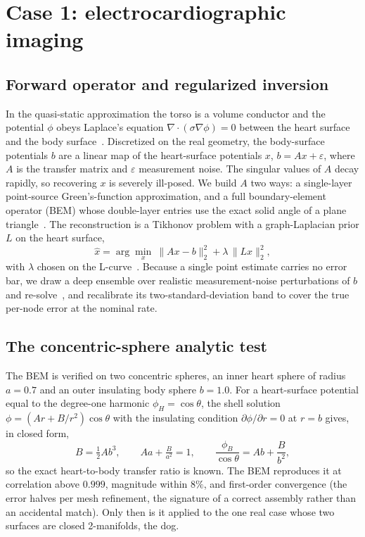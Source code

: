 \documentclass[journal]{IEEEtran}
\begin{document}
\section{Case 1: electrocardiographic imaging}
\label{sec:ecgi}

\subsection{Forward operator and regularized inversion}

In the quasi-static approximation the torso is a volume conductor and the potential $\phi$
obeys Laplace's equation $\nabla\!\cdot(\sigma\nabla\phi)=0$ between the heart surface and the
body surface~\cite{bear2015}. Discretized on the real geometry, the body-surface potentials
$b$ are a linear map of the heart-surface potentials $x$, $b=Ax+\varepsilon$, where $A$ is the
transfer matrix and $\varepsilon$ measurement noise. The singular values of $A$ decay rapidly,
so recovering $x$ is severely ill-posed. We build $A$ two ways: a single-layer point-source
Green's-function approximation, and a full boundary-element operator (BEM) whose double-layer
entries use the exact solid angle of a plane triangle~\cite{vanoosterom1983}. The
reconstruction is a Tikhonov problem with a graph-Laplacian prior $L$ on the heart surface,
\begin{equation}
\hat x=\arg\min_x\ \lVert Ax-b\rVert_2^2+\lambda\,\lVert Lx\rVert_2^2,
\label{eq:tikhonov}
\end{equation}
with $\lambda$ chosen on the L-curve~\cite{hansen1992}. Because a single point estimate carries
no error bar, we draw a deep ensemble over realistic measurement-noise perturbations of
$b$ and re-solve~\cite{lakshminarayanan2017}, and recalibrate its two-standard-deviation band to
cover the true per-node error at the nominal rate.

\subsection{The concentric-sphere analytic test}

The BEM is verified on two concentric spheres, an inner heart sphere of radius $a=0.7$ and an
outer insulating body sphere $b=1.0$. For a heart-surface potential equal to the degree-one
harmonic $\phi_H=\cos\theta$, the shell solution $\phi=(Ar+B/r^2)\cos\theta$ with the
insulating condition $\partial\phi/\partial r=0$ at $r=b$ gives, in closed form,
\begin{equation}
B=\tfrac12 A b^3,\qquad Aa+\tfrac{B}{a^2}=1,\qquad \frac{\phi_B}{\cos\theta}=Ab+\frac{B}{b^2},
\end{equation}
so the exact heart-to-body transfer ratio is known. The BEM reproduces it at correlation above
$0.999$, magnitude within $8\%$, and first-order convergence (the error halves per mesh
refinement, the signature of a correct assembly rather than an accidental match). Only then is
it applied to the one real case whose two surfaces are closed 2-manifolds, the dog.
\end{document}
